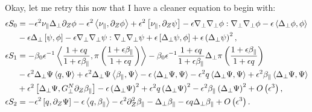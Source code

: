 \documentclass{article}
\newcommand{\para}{\parallel}
\newcommand{\ep}{\epsilon}
\newcommand{\np}{\nabla_\perp}
\newcommand{\lap}{\Delta_\perp}
\newcommand{\p}{\partial}
\newcommand{\fr}{\frac{1+\ep q}{1+\ep\beta_\para}}
\newcommand{\frinv}{\frac{1+\ep\beta_\para}{1+\ep q}}
\newcommand{\GN}{G_\perp^N}
\newcommand{\pth} [1] {\left( #1 \right) }
\newcommand{\br} [1] {\left[ #1 \right] }
\begin{document}
Okay, let me retry this now that I have a cleaner equation to begin with: 
\begin{align*}
    \ep S_0 &= -\ep^2\nu_\para \lap\p_Z\phi - \ep^2\Braket{\nu_\para, \p_Z\phi} + \ep^2\br{\nu_\para, \p_Z\psi} - \ep\np\np\phi:\np\np\phi - \ep\Braket{\lap\phi, \phi} \\ 
        &- \ep\lap\br{\psi,\phi} - \ep\np\np\psi:\np\np\psi + \ep\br{\lap\psi, \phi} + \ep\pth{\lap\psi}^2, \\ 
    \ep S_1 &= - \beta_0\ep^{-1} \Braket{\fr, \pi\pth{\frinv}} - \beta_0\ep^{-1} \fr\lap\pi\pth{\frinv} \\ 
        &- \ep^2\lap\Psi \Braket{q,\Psi} + \ep^2\lap\Psi \Braket{\beta_\para,\Psi} - \ep\Braket{\lap\Psi, \Psi} - \ep^2q \Braket{\lap\Psi, \Psi} + \ep^2 \beta_\para\Braket{\lap\Psi, \Psi} \\ 
        &+ \ep^2\br{\lap\Psi, \GN\p_Z\beta_\para} -\ep\pth{\lap\Psi}^2 + \ep^2q\pth{\lap\Psi}^2 - \ep^2\beta_\para\pth{\lap\Psi}^2 + O\pth{\ep^3}, \\ 
    \ep S_2 &= - \ep^2\br{q, \p_Z\Psi} - \ep\Braket{q,\beta_\para} - \ep^2\p^2_Z\beta_\para - \lap\beta_\para - \ep q\lap\beta_\para + O\pth{\ep^3}. 
\end{align*}
\end{document}
